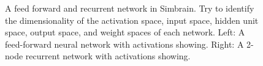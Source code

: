 \begin{figure}[h]
\centering
{}
\hspace*{1in}
\caption[Simbrain screenshots.]{A feed forward and recurrent network in Simbrain. Try to identify the dimensionality of the activation space, input space, hidden unit space, output space, and weight spaces of each network. Left: A feed-forward neural network with activations showing. Right: A 2-node recurrent network with activations showing.}
\label{ffRecurrent}
\end{figure}


